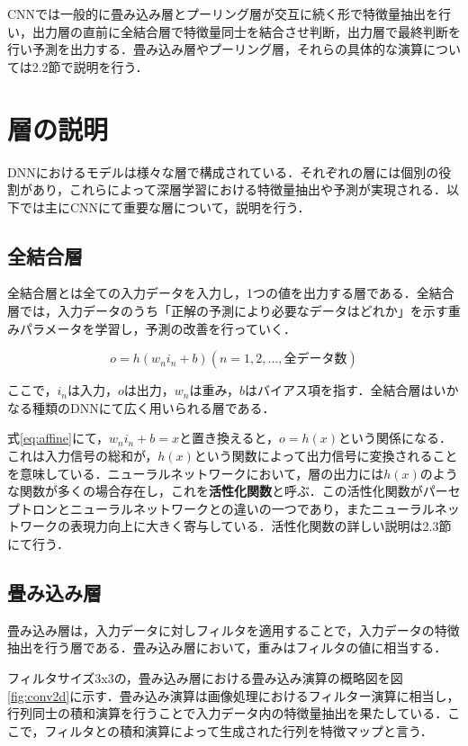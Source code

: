 \documentclass[a4j, 11pt]{jreport}
\begin{document}
CNNでは一般的に畳み込み層とプーリング層が交互に続く形で特徴量抽出を行い，出力層の直前に全結合層で特徴量同士を結合させ判断，出力層で最終判断を行い予測を出力する．畳み込み層やプーリング層，それらの具体的な演算については2.2節で説明を行う．


\section{層の説明}
DNNにおけるモデルは様々な層で構成されている．それぞれの層には個別の役割があり，これらによって深層学習における特徴量抽出や予測が実現される．以下では主にCNNにて重要な層について，説明を行う．
\subsection{全結合層}
全結合層とは全ての入力データを入力し，1つの値を出力する層である．全結合層では，入力データのうち「正解の予測により必要なデータはどれか」を示す重みパラメータを学習し，予測の改善を行っていく．

\begin{equation}
 o = h(w_n i_n + b)　(n = 1, 2, ... , 全データ数)
 \label{eq:affine}
\end{equation}

ここで，$i_n$は入力，$o$は出力，$w_n$は重み，$b$はバイアス項を指す．全結合層はいかなる種類のDNNにて広く用いられる層である．

式\ref{eq:affine}にて，$w_n i_n + b = x$と置き換えると，$o = h(x)$という関係になる．これは入力信号の総和が，$h(x)$という関数によって出力信号に変換されることを意味している．ニューラルネットワークにおいて，層の出力には$h(x)$のような関数が多くの場合存在し，これを\textbf{活性化関数}と呼ぶ．この活性化関数がパーセプトロンとニューラルネットワークとの違いの一つであり，またニューラルネットワークの表現力向上に大きく寄与している．活性化関数の詳しい説明は2.3節にて行う．
\subsection{畳み込み層}
畳み込み層は，入力データに対しフィルタを適用することで，入力データの特徴抽出を行う層である．畳み込み層において，重みはフィルタの値に相当する．

フィルタサイズ3x3の，畳み込み層における畳み込み演算の概略図を図\ref{fig:conv2d}に示す．畳み込み演算は画像処理におけるフィルター演算に相当し，行列同士の積和演算を行うことで入力データ内の特徴量抽出を果たしている．ここで，フィルタとの積和演算によって生成された行列を特徴マップと言う．
\end{document}
